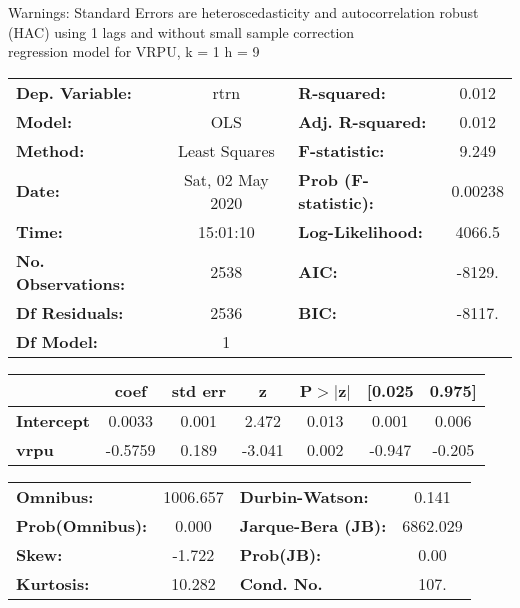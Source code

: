 Warnings: \newline
 [1] Standard Errors are heteroscedasticity and autocorrelation robust (HAC) using 1 lags and without small sample correction\\ 

regression model for VRPU, k = 1 h = 9\begin{center}
\begin{tabular}{lclc}
\toprule
\textbf{Dep. Variable:}    &       rtrn       & \textbf{  R-squared:         } &     0.012   \\
\textbf{Model:}            &       OLS        & \textbf{  Adj. R-squared:    } &     0.012   \\
\textbf{Method:}           &  Least Squares   & \textbf{  F-statistic:       } &     9.249   \\
\textbf{Date:}             & Sat, 02 May 2020 & \textbf{  Prob (F-statistic):} &  0.00238    \\
\textbf{Time:}             &     15:01:10     & \textbf{  Log-Likelihood:    } &    4066.5   \\
\textbf{No. Observations:} &        2538      & \textbf{  AIC:               } &    -8129.   \\
\textbf{Df Residuals:}     &        2536      & \textbf{  BIC:               } &    -8117.   \\
\textbf{Df Model:}         &           1      & \textbf{                     } &             \\
\bottomrule
\end{tabular}
\begin{tabular}{lcccccc}
                   & \textbf{coef} & \textbf{std err} & \textbf{z} & \textbf{P$> |$z$|$} & \textbf{[0.025} & \textbf{0.975]}  \\
\midrule
\textbf{Intercept} &       0.0033  &        0.001     &     2.472  &         0.013        &        0.001    &        0.006     \\
\textbf{vrpu}      &      -0.5759  &        0.189     &    -3.041  &         0.002        &       -0.947    &       -0.205     \\
\bottomrule
\end{tabular}
\begin{tabular}{lclc}
\textbf{Omnibus:}       & 1006.657 & \textbf{  Durbin-Watson:     } &    0.141  \\
\textbf{Prob(Omnibus):} &   0.000  & \textbf{  Jarque-Bera (JB):  } & 6862.029  \\
\textbf{Skew:}          &  -1.722  & \textbf{  Prob(JB):          } &     0.00  \\
\textbf{Kurtosis:}      &  10.282  & \textbf{  Cond. No.          } &     107.  \\
\bottomrule
\end{tabular}
\end{center}

